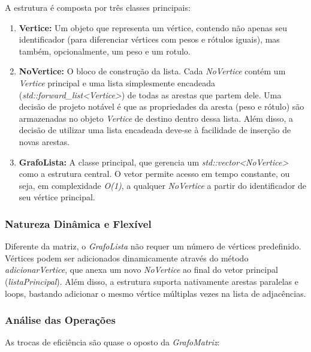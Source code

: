 \documentclass{sbc2023}%
\begin{document}
        A estrutura é composta por três classes principais:
    
        \begin{enumerate}
            \item \textbf{Vertice:} Um objeto que representa um vértice, contendo não apenas seu identificador (para diferenciar vértices com pesos e rótulos iguais), mas também, opcionalmente, um peso e um rotulo.
            \item \textbf{NoVertice:} O bloco de construção da lista. Cada \textit{NoVertice} contém um \textit{Vertice} principal e uma lista simplesmente encadeada (\textit{std::forward\_list<Vertice>}) de todas as arestas que partem dele. Uma decisão de projeto notável é que as propriedades da aresta (peso e rótulo) são armazenadas no objeto \textit{Vertice} de destino dentro dessa lista. Além disso, a decisão de utilizar uma lista encadeada deve-se à facilidade de inserção de novas arestas.
            \item \textbf{GrafoLista:} A classe principal, que gerencia um \textit{std::vector<NoVertice>} como a estrutura central. O vetor permite acesso em tempo constante, ou seja, em complexidade \textit{O(1)}, a qualquer \textit{NoVertice} a partir do identificador de seu vértice principal.
        \end{enumerate}
    
        \subsubsection{Natureza Dinâmica e Flexível}
    
        Diferente da matriz, o \textit{GrafoLista} não requer um número de vértices predefinido. Vértices podem ser adicionados dinamicamente através do método \textit{adicionarVertice}, que anexa um novo \textit{NoVertice} ao final do vetor principal (\textit{listaPrincipal}). Além disso, a estrutura suporta nativamente arestas paralelas e loops, bastando adicionar o mesmo vértice múltiplas vezes na lista de adjacências.
    
        \subsubsection{Análise das Operações}
    
        As trocas de eficiência são quase o oposto da \textit{GrafoMatriz}:
    
\end{document}
